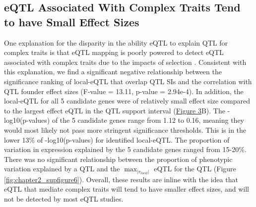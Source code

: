 \documentclass[article,9pt,twocolumn,twoside]{rilabRxiv}
\begin{document}
\subsection{eQTL Associated With Complex Traits Tend to have Small Effect Sizes}
One explanation for the disparity in the ability eQTL to explain QTL for complex traits is that eQTL mapping is poorly powered to detect eQTL associated with complex traits due to the impacts of selection \citep{Mostafavi}.
Consistent with this explanation, we find a significant negative relationship between the significance ranking of local-eQTL that overlap QTL SIs and the correlation with QTL founder effect sizes (F-value = 13.11, p-value = 2.94e-4).
In addition, the local-eQTL for all 5 candidate genes were of relatively small effect size compared to the largest effect eQTL in the QTL support interval (\hyperref[fig:candidates]{Figure 3}B).
The -log10(p-values) of the 5 candidate genes range from 1.12 to 0.16, meaning they would most likely not pass more stringent significance thresholds.
This is in the lower 13\% of -log10(p-values) for identified local-eQTL.
The proportion of variation in expression explained by the 5 candidate genes ranged from 15-20\%.
There was no significant relationship between the proportion of phenotypic variation explained by a QTL and the $\max_{|r_{local}|}$ eQTL for the QTL (Figure \ref{fig:chapter2_supfigure6}).
Overall, these results are inline with the idea that eQTL that mediate complex traits will tend to have smaller effect sizes, and will not be detected by most eQTL studies.
\end{document}
